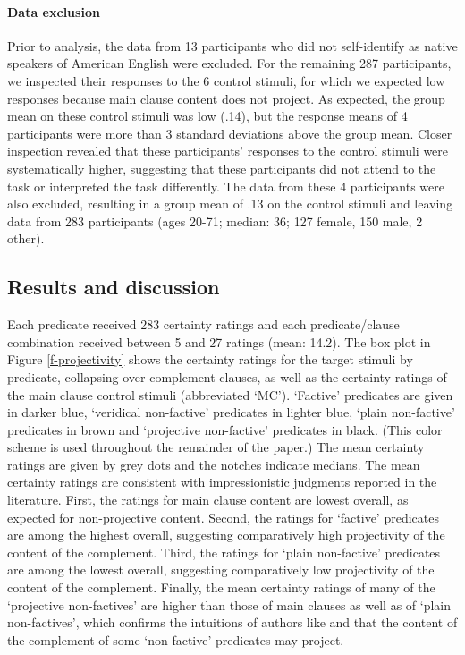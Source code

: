 \documentclass[11pt,fleqn]{article}
\newcommand{\6}{\mbox{$[\hspace*{-.6mm}[$}}
\newcommand{\9}{\mbox{$]\hspace*{-.6mm}]$}}
\newcommand{\citetpos}[1]{\citeauthor{#1}'s (\citeyear{#1})}
\begin{document}
\paragraph{Data exclusion}
Prior to analysis, the data from 13 participants who did not self-identify as native speakers of American English were excluded. For the remaining 287 participants, we inspected their responses to the 6 control stimuli, for which we expected low responses because main clause content does not project. As expected, the group mean on these control stimuli was low (.14), but the response means of 4 participants were more than 3 standard deviations above the group mean. Closer inspection revealed that these participants' responses to the control stimuli were systematically higher, suggesting that these participants did not attend to the task or interpreted the task differently. The data from these 4 participants were also excluded, resulting in a group mean of .13 on the control stimuli and leaving data from 283 participants (ages 20-71; median: 36; 127 female, 150 male, 2 other).

\subsection{Results and discussion}

Each predicate received 283 certainty ratings and each predicate/clause combination received between 5 and 27 ratings (mean: 14.2). The box plot in Figure \ref{f-projectivity} shows the certainty ratings for the target stimuli by predicate, collapsing over complement clauses, as well as the certainty ratings of the main clause control stimuli (abbreviated `MC'). `Factive' predicates are given in darker blue, `veridical non-factive' predicates in lighter blue, `plain non-factive' predicates in brown and `projective non-factive' predicates in black. (This color scheme is used throughout the remainder of the paper.) The mean certainty ratings are given by grey dots and the notches indicate medians. 
The mean certainty ratings are consistent with impressionistic judgments reported in the literature. First, the ratings for main clause content are lowest overall, as expected for non-projective content. Second, the ratings for `factive' predicates are among the highest overall, suggesting comparatively high projectivity of the content of the complement. Third, the ratings for `plain non-factive' predicates are among the lowest overall, suggesting comparatively low projectivity of the content of the complement. Finally, the mean certainty ratings of many of the `projective non-factives' are higher than those of main clauses as well as of `plain non-factives', which confirms the intuitions of authors like \citet{schlenker10,anand-hacquard2014} and \citet{spector-egre2015} that the content of the complement of some `non-factive' predicates may project.
\end{document}
